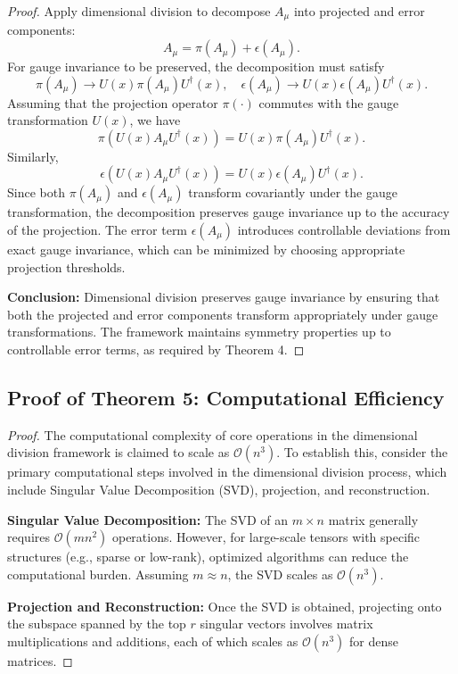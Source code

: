 \documentclass[sn-mathphys-num]{sn-jnl}
\theoremstyle{thmstyleone}
\theoremstyle{thmstyletwo}
\theoremstyle{thmstylethree}
\begin{document}
\begin{appendices}
\begin{proof}
Apply dimensional division to decompose \( A_\mu \) into projected and error components:
\[
A_\mu = \pi(A_\mu) + \epsilon(A_\mu).
\]
For gauge invariance to be preserved, the decomposition must satisfy
\[
\pi(A_\mu) \rightarrow U(x) \pi(A_\mu) U^\dagger(x), \quad \epsilon(A_\mu) \rightarrow U(x) \epsilon(A_\mu) U^\dagger(x).
\]
Assuming that the projection operator \( \pi(\cdot) \) commutes with the gauge transformation \( U(x) \), we have
\[
\pi(U(x) A_\mu U^\dagger(x)) = U(x) \pi(A_\mu) U^\dagger(x).
\]
Similarly,
\[
\epsilon(U(x) A_\mu U^\dagger(x)) = U(x) \epsilon(A_\mu) U^\dagger(x).
\]
Since both \( \pi(A_\mu) \) and \( \epsilon(A_\mu) \) transform covariantly under the gauge transformation, the decomposition preserves gauge invariance up to the accuracy of the projection. The error term \( \epsilon(A_\mu) \) introduces controllable deviations from exact gauge invariance, which can be minimized by choosing appropriate projection thresholds.

\textbf{Conclusion:}
Dimensional division preserves gauge invariance by ensuring that both the projected and error components transform appropriately under gauge transformations. The framework maintains symmetry properties up to controllable error terms, as required by Theorem 4.
\end{proof}

\subsection{Proof of Theorem 5: Computational Efficiency}\label{proof:theorem5}

\begin{proof}
The computational complexity of core operations in the dimensional division framework is claimed to scale as \( \mathcal{O}(n^3) \). To establish this, consider the primary computational steps involved in the dimensional division process, which include Singular Value Decomposition (SVD), projection, and reconstruction.

\textbf{Singular Value Decomposition:}
The SVD of an \( m \times n \) matrix generally requires \( \mathcal{O}(mn^2) \) operations. However, for large-scale tensors with specific structures (e.g., sparse or low-rank), optimized algorithms can reduce the computational burden. Assuming \( m \approx n \), the SVD scales as \( \mathcal{O}(n^3) \).

\textbf{Projection and Reconstruction:}
Once the SVD is obtained, projecting onto the subspace spanned by the top \( r \) singular vectors involves matrix multiplications and additions, each of which scales as \( \mathcal{O}(n^3) \) for dense matrices.


\end{proof}
\end{appendices}
\end{document}
